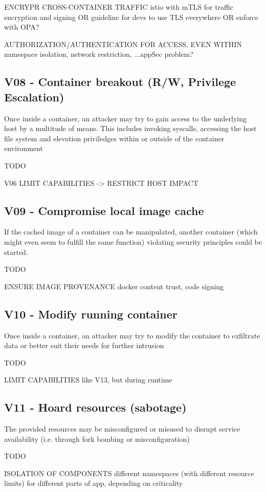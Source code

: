 ENCRYPR CROSS-CONTAINER TRAFFIC
	istio with mTLS for traffic encryption and signing OR guideline for devs to use TLS everywhere OR enforce with OPA?		
			
AUTHORIZATION/AUTHENTICATION FOR ACCESS, EVEN WITHIN
	namespace isolation, network restriction, ...appSec problem?

\subsection{V08 - Container breakout (R/W, Privilege Escalation)}
Once inside a container, an attacker may try to gain access to the underlying host by a multitude of means. This includes invoking syscalls, accessing the host file system and elevation priviledges within or outside of the container environment

TODO

V06 LIMIT CAPABILITIES -> RESTRICT HOST IMPACT

\subsection{V09 - Compromise local image cache}
If the cached image of a container can be manipulated, another container (which might even seem to fulfill the same function) violating security principles could be started.

TODO

ENSURE IMAGE PROVENANCE
	docker content trust, code signing


\subsection{V10 - Modify running container}
Once inside a container, an attacker may try to modify the container to exfiltrate data or better suit their needs for further intrusion

TODO

LIMIT CAPABILITIES
	like V13, but during runtime

\subsection{V11 - Hoard resources (sabotage)}
The provided resources may be misconfigured or misused to disrupt service availability (i.e. through fork bombing or misconfiguration)

TODO

ISOLATION OF COMPONENTS
	different namespaces (with different resource limits) for different parts of app, depending on criticality
	
